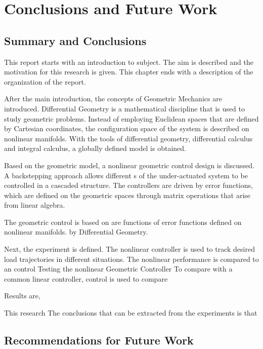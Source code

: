 \chapter{Conclusions and Future Work}\label{ch:conclusion}

\section{Summary and Conclusions}
This report starts with an introduction to subject. The aim is described and the motivation for this research is given. 
This chapter ends with a description of the organization of the report. 

After the main introduction, the concepts of Geometric Mechanics are introduced. 
Differential Geometry is a mathematical discipline that is used to study geometric problems. 
Instead of employing Euclidean spaces that are defined by Cartesian coordinates, the configuration space of the system is described on nonlinear manifolds.
With the tools of differential geometry, differential calculus and integral calculus, a globally defined model is obtained.

Based on the geometric model, a nonlinear geometric control design is discussed.  
A backstepping approach allows different s of the under-actuated system to be controlled in a cascaded structure. 
The controllers are driven by error functions, which are defined on the geometric spaces through matrix operations that arise from linear algebra.


The geometric control is based on 
 are functions
of error functions defined on nonlinear manifolds.
by Differential Geometry. 

Next, the experiment is defined. The nonlinear controller is used to track desired load trajectories in different situations. The nonlinear performance is compared to an  control 
Testing the nonlinear Geometric Controller
To compare with a common linear controller,  control is used to compare

Results are,

This research 
The conclusions that can be extracted from the experiments is that 



\section{Recommendations for Future Work}\label{ch:future}

